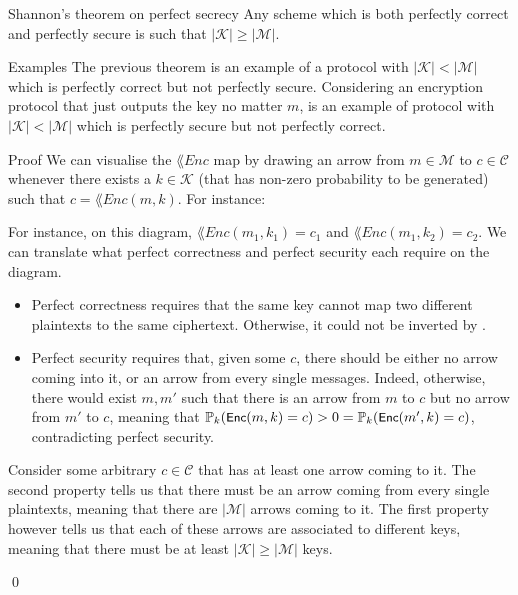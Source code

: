 \documentclass[a4paper]{article}
\begin{document}
\begin{parag}{Shannon's theorem on perfect secrecy}
    Any scheme which is both perfectly correct and perfectly secure is such that $\left|\mathcal{K}\right| \geq \left|\mathcal{M}\right|$.

    \begin{subparag}{Examples}
        The previous theorem is an example of a protocol with $\left|\mathcal{K}\right| < \left|\mathcal{M}\right|$ which is perfectly correct but not perfectly secure. Considering an encryption protocol that just outputs the key no matter $m$, is an example of protocol with $\left|\mathcal{K}\right| < \left|\mathcal{M}\right|$ which is perfectly secure but not perfectly correct.
    \end{subparag}

    \begin{subparag}{Proof}
        We can visualise the $\lang{Enc}$ map by drawing an arrow from $m \in \mathcal{M}$ to $c \in \mathcal{C}$ whenever there exists a $k \in \mathcal{K}$ (that has non-zero probability to be generated) such that $c = \lang{Enc}\left(m, k\right)$. For instance:

        For instance, on this diagram, $\lang{Enc}\left(m_1, k_1\right) = c_1$ and $\lang{Enc}\left(m_1, k_2\right) = c_2$. We can translate what perfect correctness and perfect security each require on the diagram.
        \begin{itemize}[left=0pt]
            \item Perfect correctness requires that the same key cannot map two different plaintexts to the same ciphertext. Otherwise, it could not be inverted by .
            \item Perfect security requires that, given some $c$, there should be either no arrow coming into it, or an arrow from every single messages. Indeed, otherwise, there would exist $m, m'$ such that there is an arrow from $m$ to $c$ but no arrow from $m'$ to $c$, meaning that $\prob_k\left(\lang{Enc}\left(m, k\right) = c\right) > 0 = \prob_k\left(\lang{Enc}\left(m', k\right) = c\right)$, contradicting perfect security.
        \end{itemize}

        Consider some arbitrary $c \in \mathcal{C}$ that has at least one arrow coming to it. The second property tells us that there must be an arrow coming from every single plaintexts, meaning that there are $\left|\mathcal{M}\right|$ arrows coming to it. The first property however tells us that each of these arrows are associated to different keys, meaning that there must be at least $\left|\mathcal{K}\right| \geq \left|\mathcal{M}\right|$ keys.

        \qed
    \end{subparag}
\end{parag}
\end{document}
